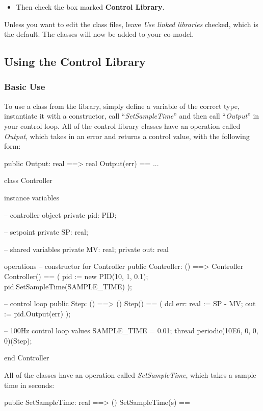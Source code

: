 \documentclass{crescendorepchap}
\begin{document}
\begin{itemize}
\item
  Then check the box marked \textbf{Control Library}.
\end{itemize}

Unless you want to edit the class files, leave \emph{Use linked libraries}
checked, which is the default. The classes will now be added to your co-model.

\subsection{Using the Control Library}

\subsubsection{Basic Use}

To use a class from the library, simply define a variable of the correct
type, instantiate it with a constructor, call ``\emph{SetSampleTime}'' and then
call ``\emph{Output}'' in your control loop. All of the control library classes
have an operation called \emph{Output}, which takes in an error and
returns a control value, with the following form:

\begin{vdmrt}
public Output: real ==> real
Output(err) == ...

class Controller

instance variables

-- controller object
private pid: PID;

-- setpoint
private SP: real;

-- shared variables
private MV: real;
private out: real

operations
-- constructor for Controller
public Controller: () ==> Controller
Controller() == (
  pid := new PID(10, 1, 0.1);
  pid.SetSampleTime(SAMPLE_TIME)
);

-- control loop
public Step: () ==> ()
Step() == (
  dcl err: real := SP - MV;
  out := pid.Output(err)
);

-- 100Hz control loop
values SAMPLE_TIME = 0.01;
thread periodic(10E6, 0, 0, 0)(Step);

end Controller
\end{vdmrt}

\noindent All of the classes have an operation called \emph{SetSampleTime},
which takes a sample time in seconds:

\begin{vdmrt}
public SetSampleTime: real ==> ()
SetSampleTime(s) ==
\end{vdmrt}
\end{document}
